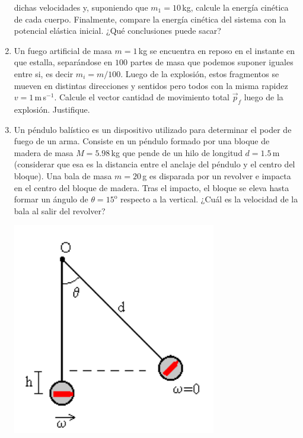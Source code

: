 \documentclass[a4paper,12pt]{article}
\begin{document}
\begin{enumerate}
		dichas velocidades y, suponiendo que $m_1=10$\,kg, calcule la energía
		cinética de cada cuerpo. Finalmente, compare la energía cinética del
		sistema con la potencial elástica inicial. ¿Qué conclusiones puede
		sacar?
	\item Un fuego artificial de masa $m=1$\,kg se encuentra en reposo en el
		instante en que estalla, separándose en $100$ partes de masa que
		podemos suponer iguales entre si, es decir $m_i=m/100$. Luego de la
		explosión, estos fragmentos se mueven en distintas direcciones y
		sentidos pero todos con la misma rapidez $v=1$\,m\,s$^{-1}$. Calcule el
		vector cantidad de movimiento total $\vec p_f$ luego de la explosión.
		Justifique.
    \vspace{-2.5cm}
	\item
		\begin{minipage}[t]{0.695\textwidth}
			Un péndulo balístico es un dispositivo utilizado para determinar el
			poder de fuego de un arma. Consiste en un péndulo formado por una
			bloque de madera de masa $M=5.98$\,kg que pende de un hilo de
			longitud $d=1.5$\,m (considerar que esa es la distancia entre el
			anclaje del péndulo y el centro del bloque). Una bala de masa
			$m=20$\,g es disparada por un revolver e impacta en el centro del
			bloque de madera. Tras el impacto, el bloque se eleva hasta formar
			un ángulo de $\theta=15^\mathrm{o}$ respecto a la vertical. ¿Cuál
			es la velocidad de la bala al salir del revolver?
		\end{minipage}
		\begin{minipage}[]{0.295\textwidth}
			\vspace{2.5cm}
			\includegraphics[width=0.7\textwidth]{balistico.png}

\end{minipage}
\end{enumerate}
\end{document}
